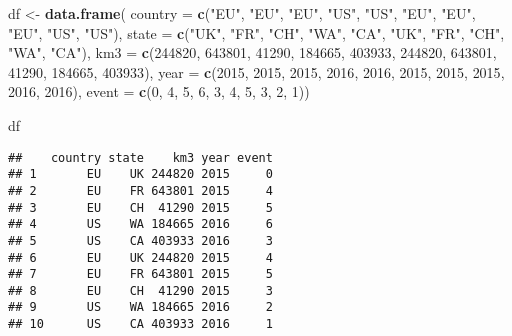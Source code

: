 \documentclass[]{book}
\newenvironment{Shaded}{\begin{snugshade}}{\end{snugshade}}
\newcommand{\KeywordTok}[1]{\textcolor[rgb]{0.13,0.29,0.53}{\textbf{{#1}}}}
\newcommand{\DataTypeTok}[1]{\textcolor[rgb]{0.13,0.29,0.53}{{#1}}}
\newcommand{\DecValTok}[1]{\textcolor[rgb]{0.00,0.00,0.81}{{#1}}}
\newcommand{\StringTok}[1]{\textcolor[rgb]{0.31,0.60,0.02}{{#1}}}
\newcommand{\NormalTok}[1]{{#1}}
\begin{document}
\begin{Shaded}
\begin{Highlighting}[]
\NormalTok{df <-}\StringTok{ }\KeywordTok{data.frame}\NormalTok{(}
  \DataTypeTok{country =}  \KeywordTok{c}\NormalTok{(}\StringTok{"EU"}\NormalTok{, }\StringTok{"EU"}\NormalTok{, }\StringTok{"EU"}\NormalTok{, }\StringTok{"US"}\NormalTok{, }\StringTok{"US"}\NormalTok{, }\StringTok{"EU"}\NormalTok{, }\StringTok{"EU"}\NormalTok{, }\StringTok{"EU"}\NormalTok{, }\StringTok{"US"}\NormalTok{, }\StringTok{"US"}\NormalTok{),}
  \DataTypeTok{state =} \KeywordTok{c}\NormalTok{(}\StringTok{"UK"}\NormalTok{, }\StringTok{"FR"}\NormalTok{, }\StringTok{"CH"}\NormalTok{, }\StringTok{"WA"}\NormalTok{, }\StringTok{"CA"}\NormalTok{,   }\StringTok{"UK"}\NormalTok{,   }\StringTok{"FR"}\NormalTok{,   }\StringTok{"CH"}\NormalTok{,   }\StringTok{"WA"}\NormalTok{,   }\StringTok{"CA"}\NormalTok{),}
  \DataTypeTok{km3 =} \KeywordTok{c}\NormalTok{(}\DecValTok{244820}\NormalTok{, }\DecValTok{643801}\NormalTok{, }\DecValTok{41290}\NormalTok{,    }\DecValTok{184665}\NormalTok{, }\DecValTok{403933}\NormalTok{, }\DecValTok{244820}\NormalTok{, }\DecValTok{643801}\NormalTok{, }\DecValTok{41290}\NormalTok{, }\DecValTok{184665}\NormalTok{, }\DecValTok{403933}\NormalTok{),}
  \DataTypeTok{year =} \KeywordTok{c}\NormalTok{(}\DecValTok{2015}\NormalTok{,    }\DecValTok{2015}\NormalTok{,   }\DecValTok{2015}\NormalTok{,   }\DecValTok{2016}\NormalTok{,   }\DecValTok{2016}\NormalTok{,   }\DecValTok{2015}\NormalTok{,   }\DecValTok{2015}\NormalTok{,   }\DecValTok{2015}\NormalTok{,   }\DecValTok{2016}\NormalTok{,   }\DecValTok{2016}\NormalTok{),}
  \DataTypeTok{event =} \KeywordTok{c}\NormalTok{(}\DecValTok{0}\NormalTok{, }\DecValTok{4}\NormalTok{,   }\DecValTok{5}\NormalTok{, }\DecValTok{6}\NormalTok{, }\DecValTok{3}\NormalTok{, }\DecValTok{4}\NormalTok{, }\DecValTok{5}\NormalTok{, }\DecValTok{3}\NormalTok{,   }\DecValTok{2}\NormalTok{, }\DecValTok{1}\NormalTok{))}

\NormalTok{df}
\end{Highlighting}
\end{Shaded}

\begin{verbatim}
##    country state    km3 year event
## 1       EU    UK 244820 2015     0
## 2       EU    FR 643801 2015     4
## 3       EU    CH  41290 2015     5
## 4       US    WA 184665 2016     6
## 5       US    CA 403933 2016     3
## 6       EU    UK 244820 2015     4
## 7       EU    FR 643801 2015     5
## 8       EU    CH  41290 2015     3
## 9       US    WA 184665 2016     2
## 10      US    CA 403933 2016     1
\end{verbatim}
\end{document}
